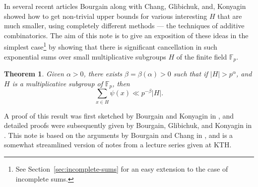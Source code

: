 \documentclass[11pt]{amsart}
\newtheorem{thm}{Theorem}[section]
\newcommand{\fp}{\mathbb{F}_p}
\begin{document}
In several recent articles Bourgain along with Chang, Glibichuk, and,
Konyagin showed how to get non-trivial upper bounds for various
interesting $H$ that are much smaller, using completely different
methods --- the techniques of additive combinatorics.  The aim of this
note is to give an exposition of these ideas in the simplest
case\footnote{See Section~\ref{sec:incomplete-sums} for an easy
extension to the case of incomplete sums.} by
showing that there is significant cancellation in such exponential
sums over small multiplicative subgroups $H$ of the finite field
$\fp$.  
%
\begin{thm}
\label{t:main} Given $\alpha > 0$, there exists $\beta =
\beta(\alpha) > 0$ such that if $|H| > p^\alpha$,
and $H$ is a multiplicative subgroup of  $\fp$,
then
\begin{equation}
  \label{eq:basic-exp-sum}
\sum_{x \in H} \psi( x) \ll p^{-\beta}|H| .
\end{equation}
\end{thm}


A proof of this result was first sketched by
Bourgain and Konyagin in \cite{boko03}, and  detailed proofs were
subsequently given
by Bourgain, Glibichuk, and Konyagin in \cite{boglko06}.
%
This note is based on the arguments by Bourgain and Chang in
\cite{boch06}, and is a somewhat streamlined version of notes from
a lecture series  given at KTH.
\end{document}

